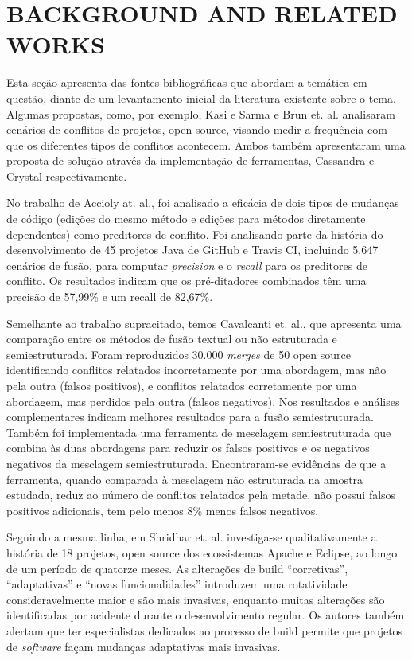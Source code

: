 \documentclass[sigconf,review]{acmart}
\begin{document}
\section{BACKGROUND AND RELATED WORKS}

Esta seção apresenta das fontes bibliográficas que abordam a temática em questão, diante de um levantamento inicial da literatura existente sobre o tema. Algumas propostas, como, por exemplo, Kasi e Sarma\cite{kasi2013cassandra} e Brun et. al.\cite{brun2013early} analisaram cenários de conflitos de projetos, open source, visando medir a frequência com que os diferentes tipos de conflitos acontecem. Ambos também apresentaram uma proposta de solução através da implementação de ferramentas, Cassandra e Crystal respectivamente.

No trabalho de Accioly at. al.\cite{accioly2018analyzing}, foi analisado a eficácia de dois tipos de mudanças de código (edições do mesmo método e edições para métodos diretamente dependentes) como preditores de conflito. Foi analisando parte da história do desenvolvimento de 45 projetos Java de GitHub e Travis CI, incluindo 5.647 cenários de fusão, para computar \emph{precision} e o \emph{recall} para os preditores de conflito. Os resultados indicam que os pré-ditadores combinados têm uma precisão de 57,99\% e um recall de 82,67\%. 

Semelhante ao trabalho supracitado, temos Cavalcanti et. al.\cite{10.1145/3133883}, que apresenta uma comparação entre os métodos de fusão textual ou não estruturada e semiestruturada. Foram reproduzidos 30.000 \emph{merges} de 50 open source identificando conflitos relatados incorretamente por uma abordagem, mas não pela outra (falsos positivos), e conflitos relatados corretamente por uma abordagem, mas perdidos pela outra (falsos negativos). Nos resultados e análises complementares indicam melhores resultados para a fusão semiestruturada. Também foi implementada uma ferramenta de mesclagem semiestruturada que combina às duas abordagens para reduzir os falsos positivos e os negativos negativos da mesclagem semiestruturada. Encontraram-se evidências de que a ferramenta, quando comparada à mesclagem não estruturada na amostra estudada, reduz ao número de conflitos relatados pela metade, não possui falsos positivos adicionais, tem pelo menos 8\% menos falsos negativos.

Seguindo a mesma linha, em Shridhar et. al.\cite{10.1145/2652524.2652547} investiga-se qualitativamente a história de 18 projetos, open source dos ecossistemas Apache e Eclipse, ao longo de um período de quatorze meses. As alterações de build “corretivas”, “adaptativas” e “novas funcionalidades” introduzem uma rotatividade consideravelmente maior e são mais invasivas, enquanto muitas alterações são identificadas por acidente durante o desenvolvimento regular. Os autores também alertam que ter especialistas dedicados ao processo de build permite que projetos de \emph{software} façam mudanças adaptativas mais invasivas.
\end{document}
